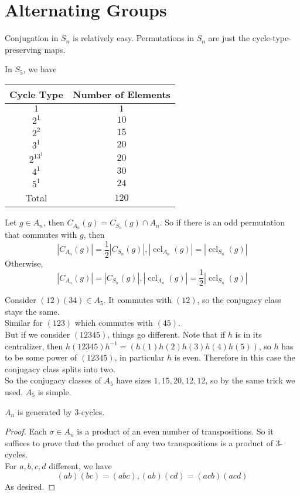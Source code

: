\section{Alternating Groups}
Conjugation in $S_n$ is relatively easy.
Permutations in $S_n$ are just the cycle-type-preserving maps.
\begin{example}
    In $S_5$, we have
    \begin{center}
        \begin{tabular}{c|c}
            Cycle Type&Number of Elements\\
            \hline
            $1$&$1$\\
            $2^1$&$10$\\
            $2^2$&$15$\\
            $3^1$&$20$\\
            $2^13^1$&$20$\\
            $4^1$&$30$\\
            $5^1$&$24$\\
            \hline
            Total&$120$
        \end{tabular}
    \end{center}
\end{example}
Let $g\in A_n$, then $C_{A_n}(g)=C_{S_n}(g)\cap A_n$.
So if there is an odd permutation that commutes with $g$, then
$$|C_{A_n}(g)|=\frac{1}{2}|C_{S_n}(g)|,|\operatorname{ccl}_{A_n}(g)|=|\operatorname{ccl}_{S_n}(g)|$$
Otherwise,
$$|C_{A_n}(g)|=|C_{S_n}(g)|,|\operatorname{ccl}_{A_n}(g)|=\frac{1}{2}|\operatorname{ccl}_{S_n}(g)|$$
\begin{example}
    Consider $(12)(34)\in A_5$.
    It commutes with $(12)$, so the conjugacy class stays the same.\\
    Similar for $(123)$ which commutes with $(45)$.\\
    But if we consider $(12345)$, things go different.
    Note that if $h$ is in its centralizer, then $h(12345)h^{-1}=(h(1)h(2)h(3)h(4)h(5))$, so $h$ has to be some power of $(12345)$, in particular $h$ is even.
    Therefore in this case the conjugacy class splits into two.\\
    So the conjugacy classes of $A_5$ have sizes $1,15,20,12,12$, so by the same trick we used, $A_5$ is simple.
\end{example}
\begin{lemma}
    $A_n$ is generated by $3$-cycles.
\end{lemma}
\begin{proof}
    Each $\sigma\in A_n$ is a product of an even number of transpositions.
    So it suffices to prove that the product of any two transpositions is a product of $3$-cycles.\\
    For $a,b,c,d$ different, we have
    $$(ab)(bc)=(abc),(ab)(cd)=(acb)(acd)$$
    As desired.
\end{proof}
